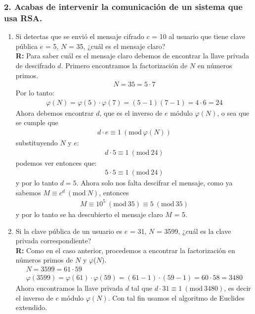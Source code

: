 \documentclass[14pt]{article}
\newcommand{\Mod}[1]{\ (\mathrm{mod}\ #1)}
\begin{document}
\subsubsection*{2. Acabas de intervenir la comunicación de un sistema que usa RSA.}
\begin{enumerate}[label=\alph*)]
\item Si detectas que se envió el mensaje cifrado $c$ = 10 al usuario que tiene clave pública $e$ = 5, $N$ = 35, ¿cuál es el mensaje claro? \\

  \textbf{R:} Para saber cuál es el mensaje claro debemos de encontrar la llave privada de descifrado $d$. Primero encontramos la factorización de $N$ en números primos.
  \begin{gather*}
    N = 35 = 5 \cdot 7
  \end{gather*}
  Por lo tanto:
  \begin{gather*}
    \varphi(N) = \varphi(5) \cdot \varphi(7) = (5 - 1) (7 - 1) = 4 \cdot 6 = 24
  \end{gather*}
  Ahora debemos encontrar $d$, que es el inverso de $e$ módulo $\varphi(N)$, o sea que se cumple que
  \begin{gather*}
    d \cdot e \equiv 1 \Mod{\varphi(N)}
  \end{gather*}
  substituyendo $N$ y $e$:
  \begin{gather*}
    d \cdot 5 \equiv 1 \Mod{24}
  \end{gather*}
  podemos ver entonces que:
  \begin{gather*}
    5 \cdot 5 \equiv 1 \Mod{24}
  \end{gather*}
  y por lo tanto $d = 5$. Ahora solo nos falta descifrar el mensaje, como ya sabemos $M \equiv c^d \Mod{N}$, entonces
  \begin{gather*}
    M \equiv 10^5 \Mod{35} \equiv 5 \Mod{35}
  \end{gather*}
  y por lo tanto se ha descubierto el mensaje claro $M$ = 5.
  
 \item Si la clave pública de un usuario es $e$ = 31, $N$ = 3599, ¿cuál es la clave privada correspondiente? \\
   
   \textbf{R:}
   Como en el caso anterior, procedemos a encontrar la factorización en números primos de $N$ y $\varphi$($N$).
  \begin{gather*}
    N = 3599 = 61 \cdot 59 \\
    \varphi(3599) = \varphi(61) \cdot \varphi(59) = (61 - 1) \cdot (59 - 1) = 60 \cdot 58 = 3480
  \end{gather*}
  Ahora encontramos la llave privada $d$ tal que $d \cdot 31 \equiv 1 \Mod{3480}$, es decir el inverso de $e$ módulo $\varphi(N)$. Con tal fin usamos el algoritmo de Euclides extendido. \\
  

\end{enumerate}
\end{document}
